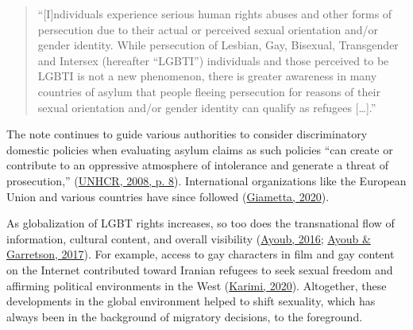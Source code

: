 \documentclass[
  11pt,
]{article}
\begin{document}
\begin{quote}
``{[}I{]}ndividuals experience serious human rights abuses and other forms of persecution due to their actual or perceived sexual orientation and/or gender identity. While persecution of Lesbian, Gay, Bisexual, Transgender and Intersex (hereafter ``LGBTI'') individuals and those perceived to be LGBTI is not a new phenomenon, there is greater awareness in many countries of asylum that people fleeing persecution for reasons of their sexual orientation and/or gender identity can qualify as refugees {[}\ldots{]}.''
\end{quote}

The note continues to guide various authorities to consider discriminatory domestic policies when evaluating asylum claims as such policies ``can create or contribute to an oppressive atmosphere of intolerance and generate a threat of prosecution,'' (\protect\hyperlink{ref-unhcr_2008}{UNHCR, 2008, p. 8}). International organizations like the European Union and various countries have since followed (\protect\hyperlink{ref-giametta_2020}{Giametta, 2020}).

As globalization of LGBT rights increases, so too does the transnational flow of information, cultural content, and overall visibility (\protect\hyperlink{ref-ayoub_2016}{Ayoub, 2016}; \protect\hyperlink{ref-ayoub_2017}{Ayoub \& Garretson, 2017}). For example, access to gay characters in film and gay content on the Internet contributed toward Iranian refugees to seek sexual freedom and affirming political environments in the West (\protect\hyperlink{ref-karimi_2020}{Karimi, 2020}). Altogether, these developments in the global environment helped to shift sexuality, which has always been in the background of migratory decisions, to the foreground.
\end{document}
